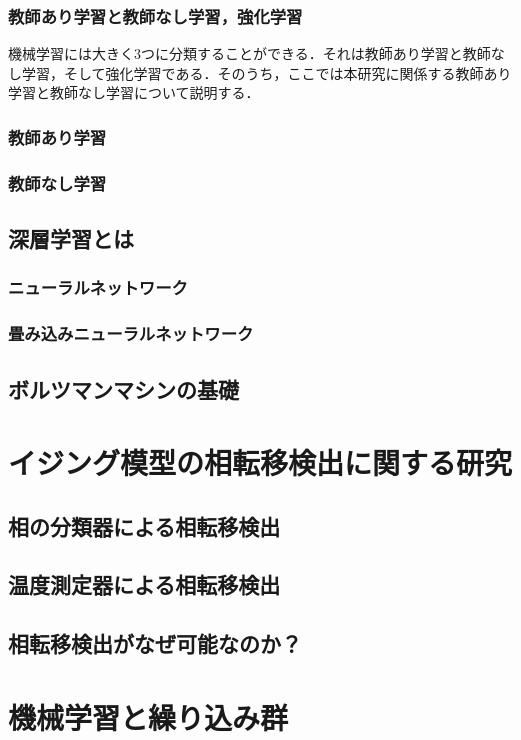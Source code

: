 \documentclass[a4paper,11pt]{jsreport}
\begin{document}
\subsection{教師あり学習と教師なし学習，強化学習}
機械学習には大きく3つに分類することができる．それは教師あり学習と教師なし学習，そして強化学習である．そのうち，ここでは本研究に関係する教師あり学習と教師なし学習について説明する．
\subsection*{教師あり学習}

\subsection*{教師なし学習}

\section{深層学習とは}
\subsection{ニューラルネットワーク}
\subsection{畳み込みニューラルネットワーク}
\section{ボルツマンマシンの基礎}

\chapter{イジング模型の相転移検出に関する研究}
\section{相の分類器による相転移検出}
\section{温度測定器による相転移検出}
\section{相転移検出がなぜ可能なのか？}

\chapter{機械学習と繰り込み群}
\end{document}
